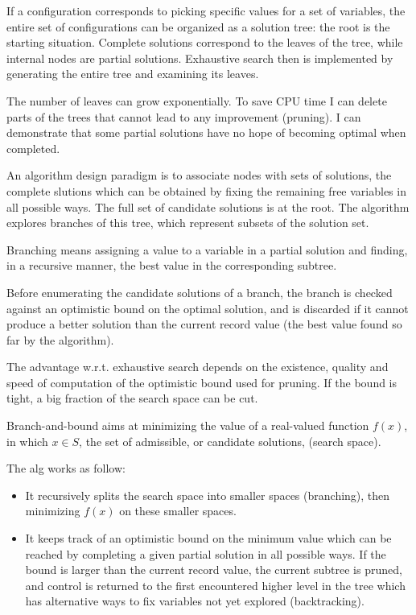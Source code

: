 \documentclass[11pt]{article}
\begin{document}
If a configuration corresponds to picking specific values for a set of variables, the entire set of configurations can be organized as a solution tree: the root is the starting situation.
Complete solutions correspond to the leaves of the tree, while internal nodes are partial solutions. Exhaustive search then is implemented by generating the entire tree and examining its leaves.
 
The number of leaves can grow exponentially. To save CPU time I can delete parts of the trees that cannot lead to any improvement (pruning). I can demonstrate that some partial solutions have no hope of becoming optimal when completed.

An algorithm design paradigm is to associate nodes with sets of solutions, the complete slutions which can be obtained by fixing the remaining free variables in all possible ways. The full set of candidate solutions is at the root. The algorithm explores branches of this tree, which represent subsets of the solution set. 

Branching means assigning a value to a variable in a partial solution and finding, in a recursive manner, the best value in the corresponding subtree. 

Before enumerating the candidate solutions of a branch, the branch is checked against an optimistic bound on the optimal solution, and
is discarded if it cannot produce a better solution than the current record value (the best value found so far by the algorithm).

The advantage w.r.t. exhaustive search depends on the existence, quality and speed of computation of the optimistic bound used for pruning. If the bound is tight, a big fraction of the search space can be cut.

Branch-and-bound aims at minimizing the value of a real-valued function $ f(x) $, in which $ x \in S $, the set of admissible, or candidate solutions, (search space).

The alg works as follow:

\begin{itemize}
\item It recursively splits the search space into smaller spaces (branching), then minimizing $ f(x) $ on these smaller spaces.
\item It keeps track of an optimistic bound on the minimum value which can be reached by completing a given partial solution in all possible ways. If the bound is larger than the current record value, the current subtree is pruned, and control is returned to the first encountered higher level in the tree which has alternative ways to fix variables
not yet explored (backtracking).
\end{itemize}
\end{document}
